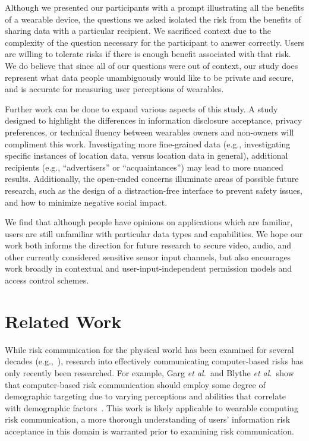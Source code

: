 \documentclass[conference]{IEEEtran}
\begin{document}
Although we presented our participants with a prompt illustrating all the benefits of a wearable device, the questions we asked isolated the risk from the benefits of sharing data with a particular recipient. We sacrificed context due to the complexity of the question necessary for the participant to answer correctly. Users are willing to tolerate risks if there is enough benefit associated with that risk. We do believe that since all of our questions were out of context, our study does represent what data people unambiguously would like to be private and secure, and is accurate for measuring user perceptions of wearables.

Further work can be done to expand various aspects of this study. A study designed to highlight the differences in information disclosure acceptance, privacy preferences, or technical fluency between wearables owners and non-owners will compliment this work. Investigating more fine-grained data (e.g., investigating specific instances of location data, versus location data in general),  additional recipients (e.g., ``advertisers'' or ``acquaintances'') may lead to more nuanced results.  Additionally, the open-ended concerns illuminate areas of possible future research, such as the design of a distraction-free interface to prevent safety issues, and how to minimize negative social impact. 

We find that although people have opinions on applications which are familiar, users are still unfamiliar with particular data types and capabilities. We hope our work both informs the direction for future research to secure video, audio, and other currently considered sensitive sensor input channels, but also encourages work broadly in contextual and user-input-independent permission models and access control schemes.

\section{Related Work}
While risk communication for the physical world has been examined for several decades (e.g.,~\cite{slovic2000perception, Fischhoff,Morgan2001}), research into effectively communicating computer-based risks has only recently been researched. For example, Garg {\it et al.}\ and Blythe {\it et al.}\ show that computer-based risk communication should employ some degree of demographic targeting due to varying perceptions and abilities that correlate with demographic factors~\cite{Garg2012,Blythe2011}. This work is likely applicable to wearable computing risk communication, a more thorough understanding of users'  information risk acceptance in this domain is warranted prior to examining risk communication.
\end{document}
